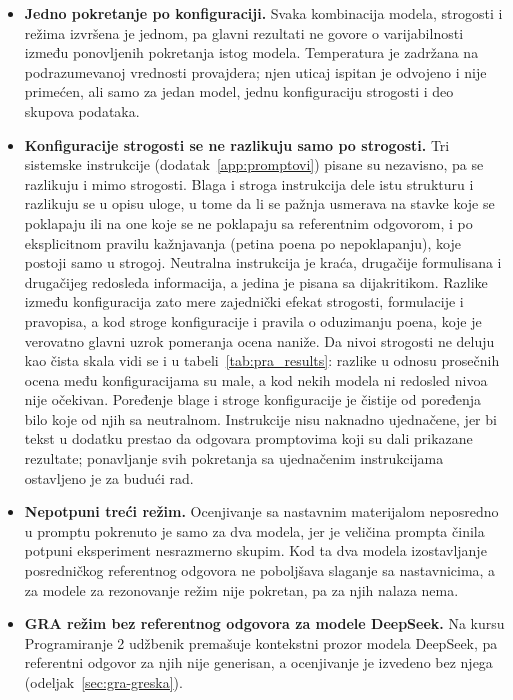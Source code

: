 \begin{itemize}
    \item \textbf{Jedno pokretanje po konfiguraciji.}
    Svaka kombinacija modela, strogosti i režima izvršena je jednom,
    pa glavni rezultati ne govore o varijabilnosti između ponovljenih pokretanja istog modela.
    Temperatura je zadržana na podrazumevanoj vrednosti provajdera;
    njen uticaj ispitan je odvojeno i nije primećen,
    ali samo za jedan model, jednu konfiguraciju strogosti i deo skupova podataka.
    \item \textbf{Konfiguracije strogosti se ne razlikuju samo po strogosti.}
    Tri sistemske instrukcije (dodatak~\ref{app:promptovi}) pisane su nezavisno, pa se razlikuju i mimo strogosti.
    Blaga i stroga instrukcija dele istu strukturu i razlikuju se u opisu uloge, u tome da li se pažnja usmerava na stavke koje se poklapaju
    ili na one koje se ne poklapaju sa referentnim odgovorom, i po eksplicitnom pravilu kažnjavanja (petina poena po nepoklapanju),
    koje postoji samo u strogoj.
    Neutralna instrukcija je kraća, drugačije formulisana i drugačijeg redosleda informacija, a jedina je pisana sa dijakritikom.
    Razlike između konfiguracija zato mere zajednički efekat strogosti, formulacije i pravopisa,
    a kod stroge konfiguracije i pravila o oduzimanju poena,
    koje je verovatno glavni uzrok pomeranja ocena naniže.
    Da nivoi strogosti ne deluju kao čista skala vidi se i u tabeli~\ref{tab:pra_results}:
    razlike u odnosu prosečnih ocena među konfiguracijama su male,
    a kod nekih modela ni redosled nivoa nije očekivan.
    Poređenje blage i stroge konfiguracije je čistije od poređenja bilo koje od njih sa neutralnom.
    Instrukcije nisu naknadno ujednačene, jer bi tekst u dodatku prestao da odgovara promptovima koji su dali prikazane rezultate;
    ponavljanje svih pokretanja sa ujednačenim instrukcijama ostavljeno je za budući rad.
    \item \textbf{Nepotpuni treći režim.}
    Ocenjivanje sa nastavnim materijalom neposredno u promptu pokrenuto je samo za dva modela,
    jer je veličina prompta činila potpuni eksperiment nesrazmerno skupim.
    Kod ta dva modela izostavljanje posredničkog referentnog odgovora ne poboljšava slaganje sa nastavnicima,
    a za modele za rezonovanje režim nije pokretan, pa za njih nalaza nema.
    \item \textbf{GRA režim bez referentnog odgovora za modele DeepSeek.}
    Na kursu Programiranje 2 udžbenik premašuje kontekstni prozor modela DeepSeek,
    pa referentni odgovor za njih nije generisan, a ocenjivanje je izvedeno bez njega (odeljak~\ref{sec:gra-greska}).

\end{itemize}
